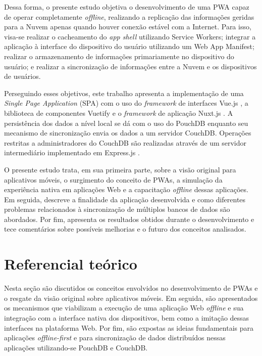 \documentclass[
	article,			%
	12pt,				%
	oneside,			%
	a4paper,			%
	english,			%
	brazil,				%
	sumario=tradicional
	]{abntex2}
\begin{document}
Dessa forma, o presente estudo objetiva o desenvolvimento de uma PWA capaz de operar completamente \textit{offline}, realizando a replicação das informações geridas para a Nuvem apenas quando houver conexão estável com a Internet. Para isso, visa-se realizar o cacheamento do \textit{app shell} utilizando Service Workers; integrar a aplicação à interface do dispositivo do usuário utilizando um Web App Manifest; realizar o armazenamento de informações primariamente no dispositivo do usuário; e realizar a sincronização de informações entre a Nuvem e os dispositivos de usuários.

Perseguindo esses objetivos, este trabalho apresenta a implementação de uma \textit{Single Page Application} (SPA) com o uso do \textit{framework} de interfaces Vue.js \cite{vuejs-2017}, a biblioteca de componentes Vuetify \cite{vuetify-2017} e o \textit{framework} de aplicação Nuxt.js \cite{nuxt-2017}. A persistência dos dados a nível local se dá com o uso do PouchDB \cite{pouchdb-2017} enquanto seu mecanismo de sincronização envia os dados a um servidor CouchDB. Operações restritas a administradores do CouchDB \cite{couchdb-2017} são realizadas através de um servidor intermediário implementado em Express.js \cite{express-2017}.

O presente estudo trata, em sua primeira parte, sobre a visão original para aplicativos móveis, o surgimento do conceito de PWAs, a simulação da experiência nativa em aplicações Web e a capacitação \textit{offline} dessas aplicações. Em seguida, descreve a finalidade da aplicação desenvolvida e como diferentes problemas relacionados à sincronização de múltiplos bancos de dados são abordados. Por fim, apresenta os resultados obtidos durante o desenvolvimento e tece comentários sobre possíveis melhorias e o futuro dos conceitos analisados.


\section{Referencial teórico}

Nesta seção são discutidos os conceitos envolvidos no desenvolvimento de PWAs e o resgate da visão original sobre aplicativos móveis. Em seguida, são apresentados os mecanismos que viabilizam a execução de uma aplicação Web \textit{offline} e sua integração com a interface nativa dos dispositivos, bem como a imitação dessas interfaces na plataforma Web. Por fim, são expostas as ideias fundamentais para aplicações \textit{offline-first} e para sincronização de dados distribuídos nessas aplicações utilizando-se PouchDB e CouchDB.
\end{document}
